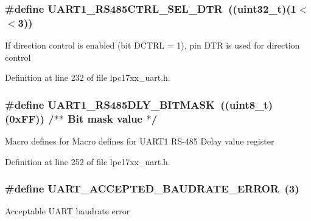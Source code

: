 \subsubsection[{\texorpdfstring{U\+A\+R\+T1\+\_\+\+R\+S485\+C\+T\+R\+L\+\_\+\+S\+E\+L\+\_\+\+D\+TR}{UART1_RS485CTRL_SEL_DTR}}]{\setlength{\rightskip}{0pt plus 5cm}\#define U\+A\+R\+T1\+\_\+\+R\+S485\+C\+T\+R\+L\+\_\+\+S\+E\+L\+\_\+\+D\+TR~(({\bf uint32\+\_\+t})(1$<$$<$3))}\hypertarget{group___u_a_r_t___private___macros_gacb179ac97fb8aacbea2cf116bc671477}{}\label{group___u_a_r_t___private___macros_gacb179ac97fb8aacbea2cf116bc671477}
If direction control is enabled (bit D\+C\+T\+RL = 1), pin D\+TR is used for direction control 

Definition at line 232 of file lpc17xx\+\_\+uart.\+h.

\subsubsection[{\texorpdfstring{U\+A\+R\+T1\+\_\+\+R\+S485\+D\+L\+Y\+\_\+\+B\+I\+T\+M\+A\+SK}{UART1_RS485DLY_BITMASK}}]{\setlength{\rightskip}{0pt plus 5cm}\#define U\+A\+R\+T1\+\_\+\+R\+S485\+D\+L\+Y\+\_\+\+B\+I\+T\+M\+A\+SK~(({\bf uint8\+\_\+t})(0x\+F\+F)) 	/$\ast$$\ast$ Bit mask value $\ast$/}\hypertarget{group___u_a_r_t___private___macros_ga0c75389e18ebd47c99cac42f7b6bee09}{}\label{group___u_a_r_t___private___macros_ga0c75389e18ebd47c99cac42f7b6bee09}
Macro defines for Macro defines for U\+A\+R\+T1 R\+S-\/485 Delay value register 

Definition at line 252 of file lpc17xx\+\_\+uart.\+h.

\subsubsection[{\texorpdfstring{U\+A\+R\+T\+\_\+\+A\+C\+C\+E\+P\+T\+E\+D\+\_\+\+B\+A\+U\+D\+R\+A\+T\+E\+\_\+\+E\+R\+R\+OR}{UART_ACCEPTED_BAUDRATE_ERROR}}]{\setlength{\rightskip}{0pt plus 5cm}\#define U\+A\+R\+T\+\_\+\+A\+C\+C\+E\+P\+T\+E\+D\+\_\+\+B\+A\+U\+D\+R\+A\+T\+E\+\_\+\+E\+R\+R\+OR~(3)}\hypertarget{group___u_a_r_t___private___macros_ga3b318954fbe283fa5da4dad6990b0b20}{}\label{group___u_a_r_t___private___macros_ga3b318954fbe283fa5da4dad6990b0b20}
Acceptable U\+A\+RT baudrate error 

